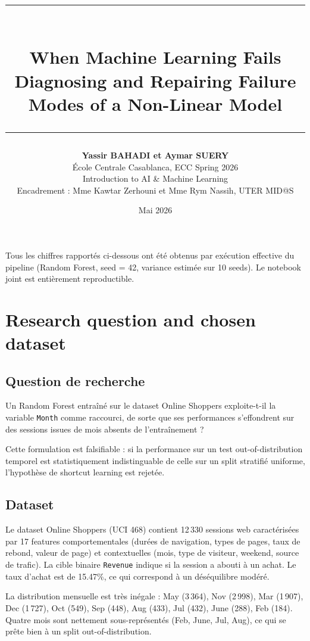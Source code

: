 \documentclass[11pt,a4paper]{article}
\title{
  \vspace{-1.5cm}
  {\color{accent}\rule{\textwidth}{1pt}} \\[0.4cm]
  \textbf{\Large When Machine Learning Fails} \\[0.2cm]
  {\large Diagnosing and Repairing Failure Modes of a Non-Linear Model} \\[0.3cm]
  {\color{accent}\rule{\textwidth}{0.5pt}}
}
\author{
  \textbf{Yassir BAHADI et Aymar SUERY} \\[0.2cm]
  \small École Centrale Casablanca, ECC Spring 2026 \\
  \small Introduction to AI \& Machine Learning \\
  \small Encadrement : Mme Kawtar Zerhouni et Mme Rym Nassih, UTER MID@S
}
\date{\small Mai 2026}
\newcommand{\code}[1]{\texttt{\small#1}}
\begin{document}
\maketitle
\thispagestyle{fancy}

\vspace{-0.5cm}
\begin{quotebox}
\small Tous les chiffres rapportés ci-dessous ont été obtenus par exécution effective du pipeline (Random Forest, seed = 42, variance estimée sur 10 seeds). Le notebook joint est entièrement reproductible.
\end{quotebox}

\section{Research question and chosen dataset}

\subsection*{Question de recherche}

\begin{quotebox}
Un Random Forest entraîné sur le dataset Online Shoppers exploite-t-il la variable \code{Month} comme raccourci, de sorte que ses performances s'effondrent sur des sessions issues de mois absents de l'entraînement ?
\end{quotebox}

Cette formulation est falsifiable : si la performance sur un test out-of-distribution temporel est statistiquement indistinguable de celle sur un split stratifié uniforme, l'hypothèse de shortcut learning est rejetée.

\subsection*{Dataset}

Le dataset Online Shoppers (UCI 468) contient 12\,330 sessions web caractérisées par 17 features comportementales (durées de navigation, types de pages, taux de rebond, valeur de page) et contextuelles (mois, type de visiteur, weekend, source de trafic). La cible binaire \code{Revenue} indique si la session a abouti à un achat. Le taux d'achat est de 15.47\%, ce qui correspond à un déséquilibre modéré.

La distribution mensuelle est très inégale : May (3\,364), Nov (2\,998), Mar (1\,907), Dec (1\,727), Oct (549), Sep (448), Aug (433), Jul (432), June (288), Feb (184). Quatre mois sont nettement sous-représentés (Feb, June, Jul, Aug), ce qui se prête bien à un split out-of-distribution.
\end{document}
